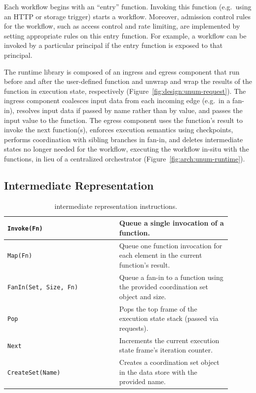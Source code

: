 Each \name{} workflow begins with an ``entry'' function. Invoking this
function (e.g.\ using an HTTP or storage trigger) starts a workflow. Moreover,
admission control rules for the workflow, such as access control and rate
limiting, are implemented by setting appropriate rules on this entry function.
For example, a workflow can be invoked by a particular principal if the entry
function is exposed to that principal.

The runtime library is composed of an ingress and egress component that run
before and after the user-defined function and unwrap and wrap the results of
the function in \name{} execution state, respectively
(Figure~\ref{fig:design:unum-request}). The ingress component coalesces input
data from each incoming edge (e.g.\ in a fan-in), resolves input data if passed
by name rather than by value, and passes the input value to the function. The
egress component uses the function's result to invoke the next function(s),
enforces execution semantics using checkpoints, performs coordination with
sibling branches in fan-in, and deletes intermediate states no longer needed for
the workflow, executing the workflow in-situ with the functions, in lieu of a
centralized orchestrator (Figure~\ref{fig:arch:unum-runtime}).

\subsection{\name{} Intermediate Representation}\label{sec:design:ir}

\begin{table}[t]
  \centering
  \begin{tabular}{|m{0.45\linewidth}|m{0.45\linewidth}|}
    \hline
  \texttt{Invoke(Fn)} & Queue a single invocation of a function.\\
    \hline
  \texttt{Map(Fn)} & Queue one function invocation for each element in the current function's result.\\
    \hline
  \texttt{FanIn(Set, Size, Fn)} & Queue a fan-in to a function using the provided coordination set object and size.\\
    \hline
  \texttt{Pop} & Pops the top frame of the execution state stack (passed via \name{} requests). \\
    \hline
  \texttt{Next} & Increments the current execution state frame's iteration counter.\\
    \hline
  \texttt{CreateSet(Name)} & Creates a coordination set object in the data store with the provided name.\\
    \hline
  \end{tabular}
  \caption{\name{} intermediate representation instructions.}
  \label{table:design:irschema}
\end{table}

